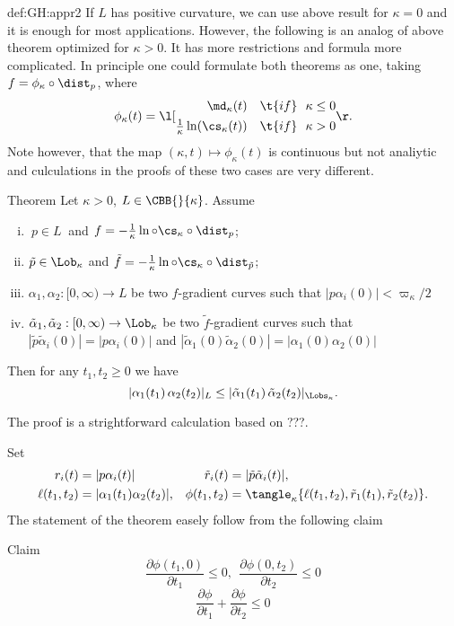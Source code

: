 {\begin{subthm}{def:GH:appr2}
If $L$ has positive curvature, we can use above result for $\kappa=0$
and it is enough for most applications.
However, the following is an analog of above theorem optimized for $\kappa>0$.
It has more restrictions and formula more complicated.
In principle one could formulate both theorems as one, taking $f=\phi_\kappa\circ\dist_p$, where 
$$\phi_\kappa(t)=
\l[
\begin{aligned}
\md_\kappa (t)& &\t{if}\ \ \kappa&\le 0\\
\tfrac1\kappa\ln(\cs_\kappa (t))& &\t{if}\ \ \kappa&> 0
\end{aligned}
\r.
$$
Note however, that the map $(\kappa,t)\mapsto \phi_\kappa(t)$ is continuous but not analiytic 
and culculations in the proofs of these two cases are very different.

\begin{thm}{Theorem} Let $\kappa> 0$, $L\in\CBB{}{\kappa}$.
Assume
\begin{enumerate}[(i)]
\item $\ p\in L\ $                   and $  f=-\tfrac1\kappa\ln\circ\cs_\kappa\circ\dist_{  p}$;
\item $\tilde p\in\Lob_\kappa$            and $\tilde f=-\tfrac1\kappa\ln\circ\cs_\kappa\circ\dist_{\tilde p}$;
\item $  \alpha_1,  \alpha_2:[0,\infty)\to           L$ be two $  f$-gradient curves such that
\subitem $|p\alpha_i(0)|<\varpi_\kappa/2$
\item $\tilde \alpha_1,\tilde \alpha_2:[0,\infty)\to \Lob_\kappa$ be two $\tilde f$-gradient curves such that
\subitem $|\tilde p\tilde \alpha_i(0)|=|p\alpha_i(0)|$ and $|\tilde \alpha_1(0)\tilde \alpha_2(0)|=|\alpha_1(0)\alpha_2(0)|$ 
\end{enumerate}
Then for any $t_1,t_2\ge 0$ we have 
$$|\alpha_1(t_1)\,\alpha_2(t_2)|_L\le |\tilde \alpha_1(t_1)\,\tilde \alpha_2(t_2)|_{\Lobs_\kappa}.$$
\end{thm}

The proof is a strightforward calculation based on ???.

Set
\begin{align*}
r_i(t)&=|p\alpha_i(t)|&\tilde r_i(t)&=|\tilde p\tilde \alpha_i(t)|,\\
\ell(t_1,t_2)&=|\alpha_1(t_1)\alpha_2(t_2)|,&\phi(t_1,t_2)&=\tangle_\kappa\{\ell(t_1,t_2),\tilde r_1(t_1),\tilde r_2(t_2)\}.
\end{align*}
The statement of the theorem easely follow from the following claim

\begin{thm}{Claim}
$$\frac{\partial\phi(t_1,0)}{\partial t_1}\le 0, \ \ \frac{\partial\phi(0,t_2)}{\partial t_2}\le 0$$
$$\frac{\partial\phi}{\partial t_1}+\frac{\partial\phi}{\partial t_2}\le 0$$
\end{thm}



\end{subthm}}
